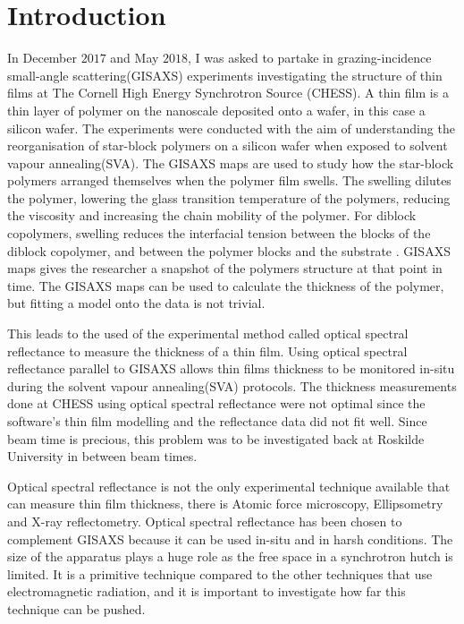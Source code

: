 \documentclass[MasterThesisMain.tex]{subfiles}
\begin{document}
	\chapter{Introduction}
	
In December $2017$ and May $2018$, I was asked to partake in grazing-incidence small-angle scattering(GISAXS) experiments investigating the structure of thin films at The Cornell High Energy Synchrotron Source (CHESS). A thin film is a thin layer of polymer on the nanoscale deposited onto a wafer, in this case a silicon wafer. The experiments were conducted with the aim of understanding the reorganisation of star-block polymers on a silicon wafer when exposed to solvent vapour annealing(SVA). The GISAXS maps are used to study how the star-block polymers arranged themselves when the polymer film swells. The swelling dilutes the polymer, lowering the glass transition temperature of the polymers, reducing the viscosity and increasing the chain mobility of the polymer. For diblock copolymers, swelling reduces the interfacial tension between the blocks of the diblock copolymer, and between the polymer blocks and the substrate \cite{posseltintro}. GISAXS maps gives the researcher a snapshot of the polymers structure at that point in time. The GISAXS maps can be used to calculate the thickness of the polymer, but fitting a model onto the data is not trivial.

This leads to the used of the experimental method called optical spectral reflectance to measure the thickness of a thin film. Using optical spectral reflectance parallel to GISAXS allows thin films thickness to be monitored in-situ during the solvent vapour annealing(SVA) protocols. The thickness measurements done at CHESS using optical spectral reflectance were not optimal since the software's thin film modelling and the reflectance data did not fit well. Since beam time is precious, this problem was to be investigated back at Roskilde University in between beam times.

Optical spectral reflectance is not the only experimental technique available that can measure thin film thickness, there is Atomic force microscopy, Ellipsometry and X-ray reflectometry. Optical spectral reflectance has been chosen to complement GISAXS because it can be used in-situ and in harsh conditions. The size of the apparatus plays a huge role as the free space in a synchrotron hutch is limited. It is a primitive technique compared to the other techniques that use electromagnetic radiation, and it is important to investigate how far this technique can be pushed.
\end{document}
